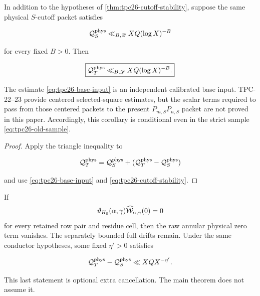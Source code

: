 \begin{corollary}
\label{cor:tpc26-truncated-square}
In addition to the hypotheses of
\cref{thm:tpc26-cutoff-stability}, suppose the same physical
\(S\)-cutoff packet satisfies

\begin{equation}
 \mathcal Q_S^{\rm phys}
 \ll_{B,\mathscr D}XQ(\log X)^{-B}
 \label{eq:tpc26-base-input}
\end{equation}

for every fixed \(B>0\).  Then

\begin{equation}
 \boxed{
 \mathcal Q_T^{\rm phys}
 \ll_{B,\mathscr D}XQ(\log X)^{-B}.}
 \label{eq:tpc26-truncated-square}
\end{equation}

The estimate \eqref{eq:tpc26-base-input} is an independent calibrated
base input.  TPC-22--23 provide centered selected-square estimates, but
the scalar terms required to pass from those centered packets to the
present \(P_{m,S}P_{n,S}\) packet are not proved in this paper.
Accordingly, this corollary is conditional even in the strict sample
\eqref{eq:tpc26-old-sample}.
\end{corollary}

\begin{proof}
Apply the triangle inequality to

\[
 \mathcal Q_T^{\rm phys}
 =\mathcal Q_S^{\rm phys}
 +(\mathcal Q_T^{\rm phys}-\mathcal Q_S^{\rm phys})
\]

and use \eqref{eq:tpc26-base-input} and
\eqref{eq:tpc26-cutoff-stability}.
\end{proof}

\begin{corollary}
\label{cor:tpc26-zero-free-test}
If
\[
 \vartheta_{H_0}(\alpha,\gamma)
 \widehat{\mathcal W}_{\alpha,\gamma}(0)=0
\]
for every retained row pair and residue cell, then the raw annular
physical zero term vanishes.  The separately bounded full drifts remain.
Under the same conductor hypotheses, some fixed \(\eta'>0\) satisfies

\begin{equation}
 \mathcal Q_T^{\rm phys}-\mathcal Q_S^{\rm phys}
 \ll XQX^{-\eta'}.
 \label{eq:tpc26-power-saving-test}
\end{equation}
\end{corollary}

This last statement is optional extra cancellation.  The main theorem
does not assume it.

